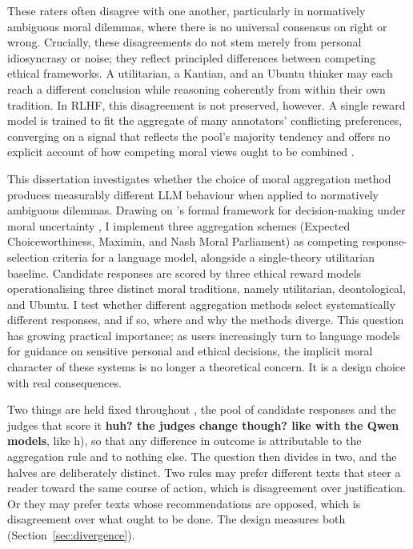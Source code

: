 \documentclass[10pt,twocolumn,a4paper]{article}
\begin{document}
These raters often disagree with one another, particularly in normatively
ambiguous moral dilemmas, where there is no universal consensus on right or
wrong. Crucially, these disagreements do not stem merely from personal
idiosyncrasy or noise; they reflect principled differences between
competing ethical frameworks. A utilitarian, a Kantian, and an Ubuntu
thinker may each reach a different conclusion while reasoning coherently
from within their own tradition. In RLHF, this disagreement is not
preserved, however. A single reward model is trained to fit the aggregate
of many annotators' conflicting preferences, converging on a signal that
reflects the pool's majority tendency and offers no explicit account of how
competing moral views ought to be combined \cite{casper2023}.

This dissertation investigates whether the choice of moral
aggregation method produces measurably different LLM behaviour when applied
to normatively ambiguous dilemmas. Drawing on \citeauthor{macaskill2020}'s
formal framework for decision-making under moral uncertainty
\cite{macaskill2020}, I implement three aggregation schemes (Expected
Choiceworthiness, Maximin, and Nash Moral Parliament) as competing
response-selection criteria for a language model, alongside a single-theory
utilitarian baseline. Candidate responses are scored by three ethical
reward models operationalising three distinct moral traditions, namely
utilitarian, deontological, and Ubuntu. I test whether different
aggregation methods select systematically different responses, and if so,
where and why the methods diverge. This question has growing practical
importance; as users increasingly turn to language models for guidance on
sensitive personal and ethical decisions, the implicit moral character of
these systems is no longer a theoretical concern. It is a design choice with
real consequences.

Two things are held fixed throughout , the pool of candidate responses and
the judges that score it \textbf{huh? the judges change though? like with the Qwen models}, like h), so that any difference in outcome is
attributable to the aggregation rule and to nothing else. The question
then divides in two, and the halves are deliberately distinct. Two rules
may prefer different texts that steer a reader toward the same course of
action, which is disagreement over justification. Or they may prefer
texts whose recommendations are opposed, which is disagreement over what
ought to be done. The design measures both
(Section~\ref{sec:divergence}).
\end{document}
